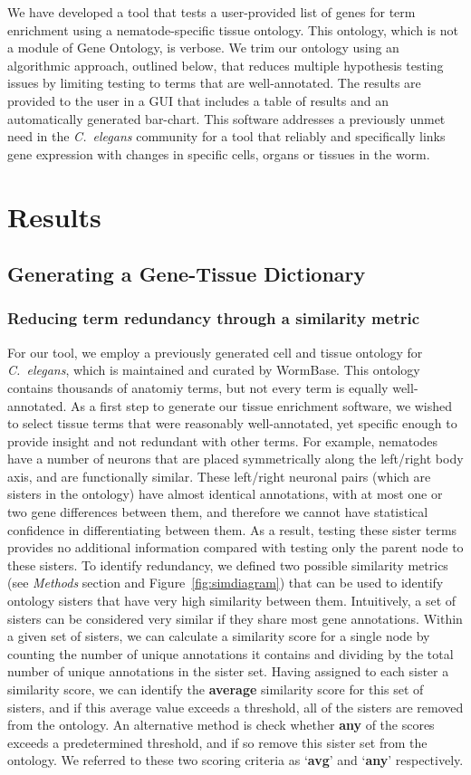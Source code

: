 \documentclass{bmcart}
\begin{document}
We have developed a tool that tests a user-provided list of genes for term enrichment using a nematode-specific tissue ontology. This ontology, which is not a module of Gene Ontology, is verbose. We trim our ontology using an algorithmic approach, outlined below, that reduces multiple hypothesis testing issues by limiting testing to terms that are well-annotated. The results are provided to the user in a GUI that includes a table of results and an automatically generated bar-chart. This software addresses a previously unmet need in the \emph{C.~elegans} community for a tool that reliably and specifically links gene expression with changes in specific cells, organs or tissues in the worm. 
\section*{Results}
\subsection*{Generating a Gene-Tissue Dictionary}
\subsubsection*{Reducing term redundancy through a similarity metric}
For our tool, we employ a previously generated cell and tissue ontology for \emph{C.~elegans}\cite{Lee2003}, which is maintained and curated by WormBase. This ontology contains thousands of anatomiy terms, but not every term is equally well-annotated. As a first step to generate our tissue enrichment software, we wished to select tissue terms that were reasonably well-annotated, yet specific enough to provide insight and not redundant with other terms. For example, nematodes have a number of neurons that are placed symmetrically along the left/right body axis, and are functionally similar. These left/right neuronal pairs (which are sisters in the ontology) have almost identical annotations, with at most one or two gene differences between them, and therefore we cannot have statistical confidence in differentiating between them. As a result, testing these sister terms provides no additional information compared with testing only the parent node to these sisters. To identify redundancy, we defined two possible similarity metrics (see \emph{Methods} section and Figure~\ref{fig:simdiagram}) that can be used to identify ontology sisters that have very high similarity between them. Intuitively, a set of sisters can be considered very similar if they share most gene annotations. Within a given set of sisters, we can calculate a similarity score for a single node by counting the number of unique annotations it contains and dividing by the total number of unique annotations in the sister set. Having assigned to each sister a similarity score, we can identify the \textbf{average} similarity score for this set of sisters, and if this average value exceeds a threshold, all of the sisters are removed from the ontology. An alternative method is check whether \textbf{any} of the scores exceeds a predetermined threshold, and if so remove this sister set from the ontology. We referred to these two scoring criteria as `\textbf{avg}' and `\textbf{any}' respectively.
\end{document}

